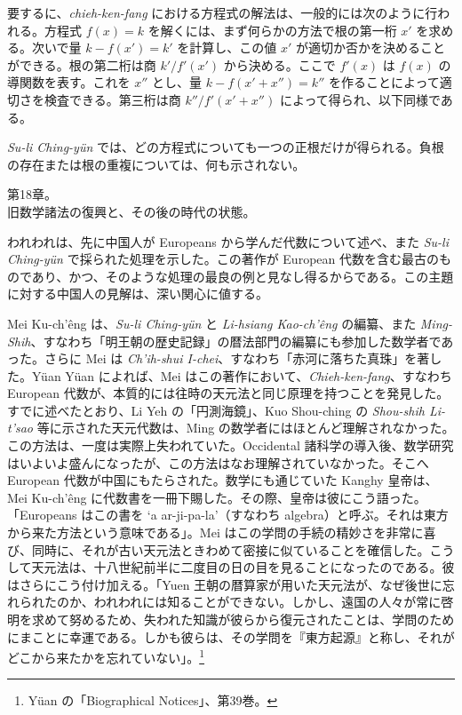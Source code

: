 \documentclass[11pt]{article}
\newcommand{\scanpage}[2]{\clearpage\setcounter{footnote}{0}\noindent{\footnotesize\color{gray}PDF #1 頁 · #2}\par\medskip}
\newcommand{\scanfooter}{}
\begin{document}
要するに、\emph{chieh-ken-fang} における方程式の解法は、一般的には次のように行われる。方程式 $f(x)=k$ を解くには、まず何らかの方法で根の第一桁 $x'$ を求める。次いで量 $k-f(x')=k'$ を計算し、この値 $x'$ が適切か否かを決めることができる。根の第二桁は商 $k'/f'(x')$ から決める。ここで $f'(x)$ は $f(x)$ の導関数を表す。これを $x''$ とし、量 $k-f(x'+x'')=k''$ を作ることによって適切さを検査できる。第三桁は商 $k''/f'(x'+x'')$ によって得られ、以下同様である。

\emph{Su-li Ching-yün} では、どの方程式についても一つの正根だけが得られる。負根の存在または根の重複については、何も示されない。
\scanfooter


\scanpage{0134}{第18章冒頭、印刷頁120}
\begin{center}
第18章。\\
旧数学諸法の復興と、その後の時代の状態。
\end{center}

われわれは、先に中国人が Europeans から学んだ代数について述べ、また \emph{Su-li Ching-yün} で採られた処理を示した。この著作が European 代数を含む最古のものであり、かつ、そのような処理の最良の例と見なし得るからである。この主題に対する中国人の見解は、深い関心に値する。

Mei Ku-ch'êng は、\emph{Su-li Ching-yün} と \emph{Li-hsiang Kao-ch'êng} の編纂、また \emph{Ming-Shih}、すなわち「明王朝の歴史記録」の暦法部門の編纂にも参加した数学者であった。さらに Mei は \emph{Ch'ih-shui I-chei}、すなわち「赤河に落ちた真珠」を著した。Yüan Yüan によれば、Mei はこの著作において、\emph{Chieh-ken-fang}、すなわち European 代数が、本質的には往時の天元法と同じ原理を持つことを発見した。すでに述べたとおり、Li Yeh の「円測海鏡」、Kuo Shou-ching の \emph{Shou-shih Li-t'sao} 等に示された天元代数は、Ming の数学者にはほとんど理解されなかった。この方法は、一度は実際上失われていた。Occidental 諸科学の導入後、数学研究はいよいよ盛んになったが、この方法はなお理解されていなかった。そこへ European 代数が中国にもたらされた。数学にも通じていた Kanghy 皇帝は、Mei Ku-ch'êng に代数書を一冊下賜した。その際、皇帝は彼にこう語った。「Europeans はこの書を `a ar-ji-pa-la'（すなわち algebra）と呼ぶ。それは東方から来た方法という意味である」。Mei はこの学問の手続の精妙さを非常に喜び、同時に、それが古い天元法ときわめて密接に似ていることを確信した。こうして天元法は、十八世紀前半に二度目の日の目を見ることになったのである。彼はさらにこう付け加える。「Yuen 王朝の暦算家が用いた天元法が、なぜ後世に忘れられたのか、われわれには知ることができない。しかし、遠国の人々が常に啓明を求めて努めるため、失われた知識が彼らから復元されたことは、学問のためにまことに幸運である。しかも彼らは、その学問を『東方起源』と称し、それがどこから来たかを忘れていない」。\footnote{Yüan の「Biographical Notices」、第39巻。}
\scanfooter
\end{document}
